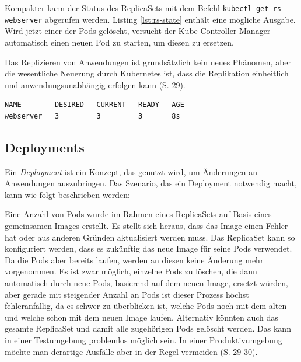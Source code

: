 \documentclass[11pt,a4paper]{article}
\begin{document}
Kompakter kann der Status des ReplicaSets mit dem Befehl \lstinline|kubectl get rs webserver|
abgerufen werden. Listing \ref{lst:rs-state} enthält eine mögliche Ausgabe.
Wird jetzt einer der Pods gelöscht, versucht der Kube-Controller-Manager automatisch
einen neuen Pod zu starten, um diesen zu ersetzen.

Das Replizieren von Anwendungen ist grundsätzlich kein neues Phänomen, aber
die wesentliche Neuerung durch Kubernetes ist, dass die Replikation einheitlich
und anwendungsunabhängig erfolgen kann \cite{Schmeling_Dargatz_2022} (S. 29).

\begin{lstlisting}[caption={Ein ReplicaSet mit drei erfolgreich gestarteten Instanzen \cite{Schmeling_Dargatz_2022} (S. 27).}, label={lst:rs-state}]
NAME        DESIRED   CURRENT   READY   AGE
webserver   3         3         3       8s
\end{lstlisting}

\subsection{Deployments}
\label{sec:Deployments}
Ein \emph{Deployment} ist ein Konzept, das genutzt wird, um Änderungen an Anwendungen auszubringen.
Das Szenario, das ein Deployment notwendig macht, kann wie folgt beschrieben werden:

Eine Anzahl von Pods wurde im Rahmen eines ReplicaSets auf Basis eines gemeinsamen Images erstellt.
Es stellt sich heraus, dass das Image einen Fehler hat oder aus anderen Gründen aktualisiert werden muss.
Das ReplicaSet kann so konfiguriert werden, dass es zukünftig das neue Image für seine Pods verwendet.
Da die Pods aber bereits laufen, werden an diesen keine Änderung mehr vorgenommen. Es ist zwar möglich,
einzelne Pods zu löschen, die dann automatisch durch neue Pods, basierend auf dem neuen Image, ersetzt würden, aber
gerade mit steigender Anzahl an Pods ist dieser Prozess höchst
fehleranfällig, da es schwer zu überblicken ist, welche Pods noch mit dem alten und welche schon mit dem
neuen Image laufen. Alternativ könnten auch das gesamte ReplicaSet und damit alle zugehörigen Pods gelöscht werden.
Das kann in einer Testumgebung problemlos möglich sein. In einer Produktivumgebung möchte man derartige
Ausfälle aber in der Regel vermeiden \cite{Schmeling_Dargatz_2022} (S. 29-30).
\end{document}
